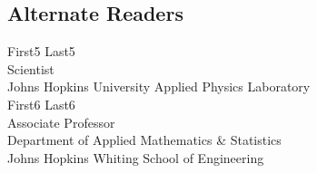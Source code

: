 \subsection*{Alternate Readers}

\begin{singlespace}


\indent First5 Last5  \\
\indent \indent Scientist \\
\indent \indent  Johns Hopkins University Applied Physics Laboratory \\

\noindent First6 Last6  \\
\indent \indent Associate Professor\\
\indent \indent Department of Applied Mathematics \& Statistics\\
\indent \indent  Johns Hopkins Whiting School of Engineering \\




\end{singlespace}















